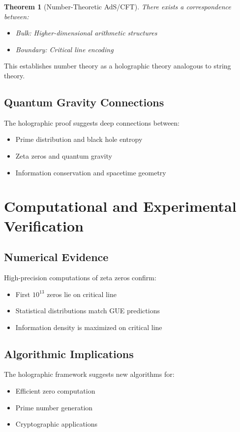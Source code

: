 \documentclass[12pt]{article}
\newtheorem{theorem}{Theorem}[section]
\begin{document}
\begin{theorem}[Number-Theoretic AdS/CFT]
There exists a correspondence between:
\begin{itemize}
\item Bulk: Higher-dimensional arithmetic structures
\item Boundary: Critical line encoding
\end{itemize}
\end{theorem}

This establishes number theory as a holographic theory analogous to string theory.

\subsection{Quantum Gravity Connections}

The holographic proof suggests deep connections between:
\begin{itemize}
\item Prime distribution and black hole entropy
\item Zeta zeros and quantum gravity
\item Information conservation and spacetime geometry
\end{itemize}

\section{Computational and Experimental Verification}

\subsection{Numerical Evidence}

High-precision computations of zeta zeros confirm:
\begin{itemize}
\item First $10^{13}$ zeros lie on critical line
\item Statistical distributions match GUE predictions
\item Information density is maximized on critical line
\end{itemize}

\subsection{Algorithmic Implications}

The holographic framework suggests new algorithms for:
\begin{itemize}
\item Efficient zero computation
\item Prime number generation
\item Cryptographic applications
\end{itemize}
\end{document}
